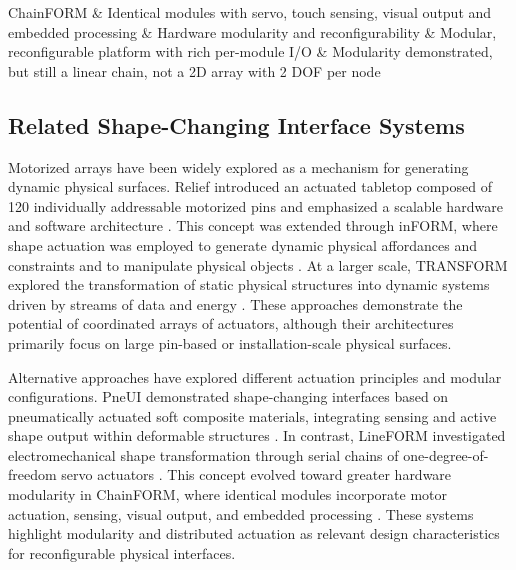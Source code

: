 \documentclass[lettersize,journal]{IEEEtran}
\begin{document}
\begin{table}[!t]
\begin{tabularx}{\textwidth}
			ChainFORM \cite{nakagaki2016chainform} &
			Identical modules with servo, touch sensing, visual output and embedded processing &
			Hardware modularity and reconfigurability &
			Modular, reconfigurable platform with rich per-module I/O &
			Modularity demonstrated, but still a linear chain, not a 2D array with 2 DOF per node \\
			
			\bottomrule
			
		\end{tabularx}
	\end{table}
	
	\subsection{Related Shape-Changing Interface Systems}
	Motorized arrays have been widely explored as a mechanism for generating
	dynamic physical surfaces. Relief introduced an actuated tabletop composed of
	120 individually addressable motorized pins and emphasized a scalable hardware
	and software architecture \cite{leithinger2010relief}. This concept was
	extended through inFORM, where shape actuation was employed to generate dynamic
	physical affordances and constraints and to manipulate physical objects
	\cite{follmer2013inform}. At a larger scale, TRANSFORM explored the
	transformation of static physical structures into dynamic systems driven by
	streams of data and energy \cite{ishii2015transform}. These approaches
	demonstrate the potential of coordinated arrays of actuators, although their
	architectures primarily focus on large pin-based or installation-scale physical
	surfaces.
	
	Alternative approaches have explored different actuation principles and
	modular configurations. PneUI demonstrated shape-changing interfaces based on
	pneumatically actuated soft composite materials, integrating sensing and active
	shape output within deformable structures \cite{yao2013pneui}. In contrast,
	LineFORM investigated electromechanical shape transformation through serial
	chains of one-degree-of-freedom servo actuators
	\cite{nakagaki2015lineform}. This concept evolved toward greater hardware
	modularity in ChainFORM, where identical modules incorporate motor actuation,
	sensing, visual output, and embedded processing
	\cite{nakagaki2016chainform}. These systems highlight modularity and
	distributed actuation as relevant design characteristics for reconfigurable
	physical interfaces.
	
\end{document}
